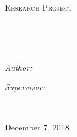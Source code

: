 \documentclass[
12pt, %
english, %
doublespacing, %
nolistspacing, %
liststotoc, %
parskip, %
headsepline, %
twoside
]{MastersDoctoralThesis} %
\author{Ray Rosario, Alec Zabel-Mena} %
\theoremstyle{plain}
\theoremstyle{definition}
\theoremstyle{remark}
\begin{document}
\frontmatter %

\pagestyle{plain} %


\begin{titlepage}
\begin{center}

\vspace*{.06\textheight}
{\scshape\LARGE \univname\par}\vspace{1.5cm} %
\textsc{\Large Research Project}\\[0.5cm] %
\subjectname

\HRule \\[0.4cm] %
{\huge \bfseries \ttitle\par}\vspace{0.4cm} %
\HRule \\[1.5cm] %
 
\begin{minipage}[t]{0.4\textwidth}
\begin{flushleft} \large
\emph{Author:}\\
{\authorname} %
\end{flushleft}
\end{minipage}
\begin{minipage}[t]{0.4\textwidth}
\begin{flushright} \large
\emph{Supervisor:} \\
\href{http://www.jamessmith.com}{\supname} %
\end{flushright}
\end{minipage}\\[3cm]
 
\vfill

 
\vfill

{\large December 7, 2018}\\[4cm] %
 
\vfill
\end{center}
\end{titlepage}
\end{document}
